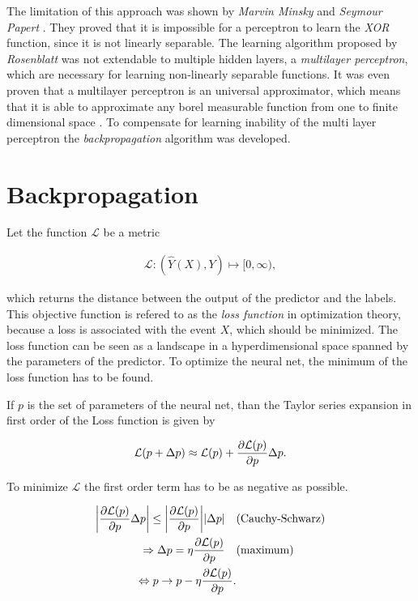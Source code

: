 \documentclass[12pt, a4paper]{thesis}
\begin{document}
The limitation of this approach was shown by \emph{Marvin Minsky} and
\emph{Seymour Papert} \cite{newell69_percep}. They proved that it is
impossible for a perceptron to learn the \emph{XOR} function, since it
is not linearly separable. The learning algorithm proposed by
\emph{Rosenblatt} was not extendable to multiple hidden layers, a
\emph{multilayer perceptron}, which are necessary for learning
non-linearly separable functions. It was even proven that a multilayer
perceptron is an universal approximator, which means that it is able
to approximate any borel measurable function from one to finite
dimensional space \cite{hornik89}. To compensate for learning
inability of the multi layer perceptron the \emph{backpropagation}
algorithm was developed.

\section{Backpropagation}
\label{sec:org8847e0d}

Let the function \(\mathcal{L}\) be a metric

\begin{align}
\mathcal{L}: \left(\hat{Y}(X), Y\right) \mapsto [0, \infty),
\end{align}

which returns the distance between the output of the predictor and the
labels. This objective function is refered to as the \emph{loss function} in
optimization theory, because a loss is associated with the event \(X\), which
should be minimized.  The loss function can be seen as a landscape in a
hyperdimensional space spanned by the parameters of the predictor. To optimize
the neural net, the minimum of the loss function has to be found.


If \(p\) is the set of parameters of the neural net, than the Taylor series
expansion in first order of the Loss function is given by

\begin{align}
\mathcal{L}(p + \Delta p) \approx \mathcal{L}(p) + \pdv{\mathcal{L}(p)}{p} \Delta p.
\end{align}

To minimize \(\mathcal{L}\) the first order term has to be as negative as possible. 

\begin{align}
\abs{\pdv{\mathcal{L}(p)}{p} \Delta p} \leq \abs{\pdv{\mathcal{L}(p)}{p}} \abs{\Delta p} \quad &(\text{Cauchy-Schwarz}) \\
\Rightarrow \Delta p = \eta \pdv{\mathcal{L}(p)}{p} \quad &(\text{maximum})\\
\Leftrightarrow p \rightarrow p - \eta \pdv{\mathcal{L}(p)}{p}.
\end{align}
\end{document}
